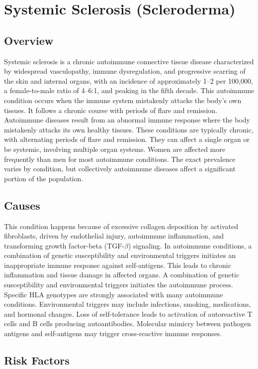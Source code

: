 \chapter{Systemic Sclerosis (Scleroderma)}
\label{sec:Systemic Sclerosis (Scleroderma)}

\section{Overview}
Systemic sclerosis is a chronic autoimmune connective tissue disease characterized by widespread vasculopathy, immune dysregulation, and progressive scarring of the skin and internal organs, with an incidence of approximately 1--2 per 100,000, a female-to-male ratio of 4--6:1, and peaking in the fifth decade. This autoimmune condition occurs when the immune system mistakenly attacks the body's own tissues. It follows a chronic course with periods of flare and remission. Autoimmune diseases result from an abnormal immune response where the body mistakenly attacks its own healthy tissues. These conditions are typically chronic, with alternating periods of flare and remission. They can affect a single organ or be systemic, involving multiple organ systems. Women are affected more frequently than men for most autoimmune conditions. The exact prevalence varies by condition, but collectively autoimmune diseases affect a significant portion of the population.
\section{Causes}
This condition happens because of excessive collagen deposition by activated fibroblasts, driven by endothelial injury, autoimmune inflammation, and transforming growth factor-beta (TGF-$\beta$) signaling. In autoimmune conditions, a combination of genetic susceptibility and environmental triggers initiates an inappropriate immune response against self-antigens. This leads to chronic inflammation and tissue damage in affected organs. A combination of genetic susceptibility and environmental triggers initiates the autoimmune process. Specific HLA genotypes are strongly associated with many autoimmune conditions. Environmental triggers may include infections, smoking, medications, and hormonal changes. Loss of self-tolerance leads to activation of autoreactive T cells and B cells producing autoantibodies. Molecular mimicry between pathogen antigens and self-antigens may trigger cross-reactive immune responses.
\section{Risk Factors}

